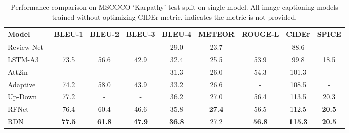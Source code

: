 \documentclass[10pt,twocolumn,letterpaper]{article}
\begin{document}
\begin{table*}[t]
	\centering
	\tabcolsep=0.15cm
	\renewcommand{\arraystretch}{0.9}
	{\small
		\begin{tabular}{ l | c c c c c c c c }
			\toprule
			Model & BLEU-1 & BLEU-2  & BLEU-3  & BLEU-4  & METEOR & ROUGE-L & CIDEr & SPICE \\
			\midrule
			Review Net~\cite{yang2016review}  & - & - & - & 29.0  & 23.7 & - & 88.6 & - \\
			LSTM-A3~\cite{yao2017boosting}  & 73.5 & 56.6 & 42.9 & 32.4  & 25.5 & 53.9 & 99.8 & 18.5 \\
			Att2in \cite{rennie2017self}  & - & - & - & 31.3  & 26.0 & 54.3 & 101.3 & - \\
			Adaptive~\cite{lu2017knowing}  & 74.2 & 58.0 & 43.9 & 33.2  & 26.6 & - & 108.5 & - \\
			Up-Down~\cite{anderson2017bottom}  & 77.2 & - & - & 36.2  & 27.0 & 56.4 & 113.5 & 20.3 \\
			RFNet~\cite{jiang2018recurrent}  & 76.4 & 60.4 & 46.6 & 35.8  & \textbf{27.4} & 56.5 & 112.5 & \textbf{20.5} \\
			\midrule
			RDN   & \textbf{77.5} & \textbf{61.8} & \textbf{47.9} & \textbf{36.8} & 27.2 & \textbf{56.8} & \textbf{115.3} & \textbf{20.5} \\
			\bottomrule
		\end{tabular}
	}
	\vspace{0.1cm}
	\caption {Performance comparison on MSCOCO `Karpathy' test split on single model. All image captioning models trained without optimizing CIDEr metric.  indicates the metric is not provided.  
	}
	\vspace{-0.1in}
	\label{table:single_karpathy}
\end{table*}
\end{document}
